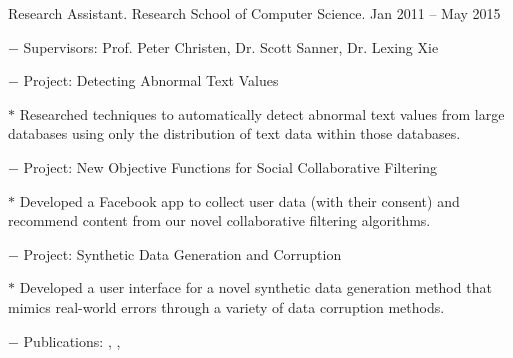 \documentclass[10pt]{article}
\begin{document}
\begin{innerlist}
	\item Research Assistant. Research School of Computer Science. \hfill {Jan 2011 -- May 2015}
	\begin{innerlist}
		\item[$-$] Supervisors: Prof. Peter Christen, Dr. Scott Sanner, Dr. Lexing Xie
		\item[$-$] Project: Detecting Abnormal Text Values
		\begin{innerlist}
			\item[$*$] Researched techniques to automatically detect abnormal text values from large databases using only the distribution of text data within those databases.
		\end{innerlist}
		\item[$-$] Project: New Objective Functions for Social Collaborative Filtering
		\begin{innerlist}
			\item[$*$] Developed a Facebook app to collect user data (with their consent) and recommend content from our novel collaborative filtering algorithms. %
		\end{innerlist}
		\item[$-$] Project: Synthetic Data Generation and Corruption
		\begin{innerlist}
			\item[$*$] Developed a user interface for a novel synthetic data generation method that mimics real-world errors through a variety of data corruption methods.
		\end{innerlist}
		\item[$-$] Publications: \cite{Christen2016}, \cite{Noel2012}, \cite{Tran2013b}
	\end{innerlist}
	

\end{innerlist}
\end{document}
